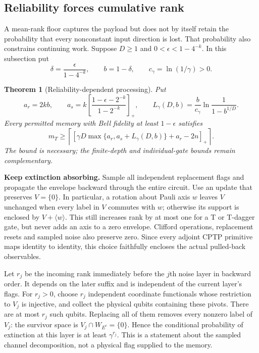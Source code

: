 \documentclass[11pt,a4paper]{article}
\numberwithin{equation}{section}
\newtheorem{theorem}{Theorem}[section]
\theoremstyle{remark}\newtheorem*{remark}{Interpretation}
\newcommand{\eps}{\epsilon}
\newcommand{\positive}[1]{\left[#1\right]_+}
\begin{document}
\subsection{Reliability forces cumulative rank}
\label{sec:reliability}
A mean-rank floor captures the payload but does not by itself retain the probability that every nonconstant input direction is lost. That probability also constrains continuing work. Suppose $D\ge1$ and $0<\eps<1-4^{-k}$. In this subsection put
\begin{equation}
\delta=\frac{\eps}{1-4^{-k}},\qquad b=1-\delta,\qquad
c_\gamma=\ln(1/\gamma)>0.
\label{eq:reliability-parameters}
\end{equation}

\begin{theorem}[Reliability-dependent processing]
Put
\begin{equation}
a_r=2kb,\qquad
a_s=k\positive{\frac{1-\eps-2^{-k}}{1-2^{-k}}},\qquad
L_\gamma(D,b)=\frac{b}{c_\gamma}
\ln\frac1{1-b^{1/D}}.
\end{equation}
Every permitted memory with Bell fidelity at least $1-\eps$ satisfies
\begin{equation}
\boxed{m_T\ge\left\lceil\positive{
\gamma D\max\{a_r,a_s+L_\gamma(D,b)\}+a_r-2n}
\right\rceil.}
\label{eq:reliability}
\end{equation}
The bound is necessary; the finite-depth and individual-gate bounds remain complementary.
\end{theorem}

\textbf{Keep extinction absorbing.}
Sample all independent replacement flags and propagate the envelope backward through the entire circuit. Use an update that preserves $V=\{0\}$. In particular, a rotation about Pauli axis $w$ leaves $V$ unchanged when every label in $V$ commutes with $w$; otherwise its support is enclosed by $V+\langle w\rangle$. This still increases rank by at most one for a T or T-dagger gate, but never adds an axis to a zero envelope. Clifford operations, replacement resets and sampled noise also preserve zero. Since every adjoint CPTP primitive maps identity to identity, this choice faithfully encloses the actual pulled-back observables.

Let $r_j$ be the incoming rank immediately before the $j$th noise layer in backward order. It depends on the later suffix and is independent of the current layer's flags. For $r_j>0$, choose $r_j$ independent coordinate functionals whose restriction to $V_j$ is injective, and collect the physical qubits containing these pivots. There are at most $r_j$ such qubits. Replacing all of them removes every nonzero label of $V_j$: the survivor space is $V_j\cap W_{E^c}=\{0\}$. Hence the conditional probability of extinction at this layer is at least $\gamma^{r_j}$. This is a statement about the sampled channel decomposition, not a physical flag supplied to the memory.
\end{document}

